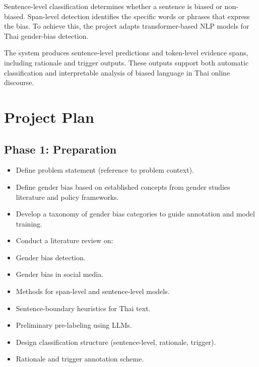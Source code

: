 \documentclass[12pt,oneside,openright,a4paper]{cpe-english-project}
\begin{document}
Sentence-level classification determines whether a sentence is biased or non-biased. Span-level detection identifies the specific words or phrases that express the bias. To achieve this, the project adapts transformer-based NLP models for Thai gender-bias detection.

The system produces sentence-level predictions and token-level evidence spans, including rationale and trigger outputs. These outputs support both automatic classification and interpretable analysis of biased language in Thai online discourse.

\section{Project Plan}

\subsection{Phase 1: Preparation}

\begin{itemize}
\item
  {Define problem statement (reference to problem context).}
\item
  {Define gender bias based on established concepts from gender studies literature and policy frameworks.}
\item
  {Develop a taxonomy of gender bias categories to guide annotation and model training.}
\end{itemize}

\begin{itemize}
\item
  {Conduct a literature review on:~~~~~~~~}
\end{itemize}

\begin{itemize}
\item
  {Gender bias detection.}
\item
  {Gender bias in social media.}
\item
  {Methods for span-level and sentence-level models.}
\item
  {Sentence-boundary heuristics for Thai text.}
\item
  {Preliminary pre-labeling using LLMs.}
\item
  {Design classification structure (sentence-level, rationale, trigger).}
\item
  {Rationale and trigger annotation scheme.}
\end{itemize}
\end{document}
